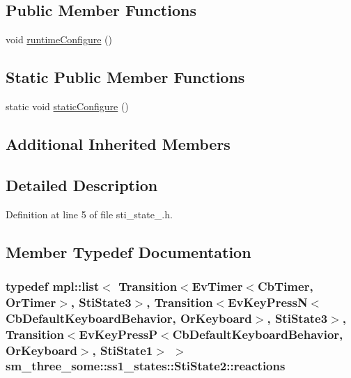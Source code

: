 \subsection*{Public Member Functions}
\begin{DoxyCompactItemize}
\item 
void \hyperlink{structsm__three__some_1_1ss1__states_1_1StiState2_ad106d6241b8c5106f0bce5292c7af09a}{runtime\+Configure} ()
\end{DoxyCompactItemize}
\subsection*{Static Public Member Functions}
\begin{DoxyCompactItemize}
\item 
static void \hyperlink{structsm__three__some_1_1ss1__states_1_1StiState2_ae3565c400d5fe4023e67b6825a168464}{static\+Configure} ()
\end{DoxyCompactItemize}
\subsection*{Additional Inherited Members}


\subsection{Detailed Description}


Definition at line 5 of file sti\+\_\+state\+\_.\+h.



\subsection{Member Typedef Documentation}
\subsubsection[{\texorpdfstring{reactions}{reactions}}]{\setlength{\rightskip}{0pt plus 5cm}typedef mpl\+::list$<$ Transition$<$Ev\+Timer$<$Cb\+Timer, {\bf Or\+Timer}$>$, {\bf Sti\+State3}$>$, Transition$<$Ev\+Key\+PressN$<$Cb\+Default\+Keyboard\+Behavior, {\bf Or\+Keyboard}$>$, {\bf Sti\+State3}$>$, Transition$<$Ev\+Key\+PressP$<$Cb\+Default\+Keyboard\+Behavior, {\bf Or\+Keyboard}$>$, {\bf Sti\+State1}$>$ $>$ {\bf sm\+\_\+three\+\_\+some\+::ss1\+\_\+states\+::\+Sti\+State2\+::reactions}}\hypertarget{structsm__three__some_1_1ss1__states_1_1StiState2_a3a6dd1b1f9cf7033bbb6e0c6bbc76f5c}{}\label{structsm__three__some_1_1ss1__states_1_1StiState2_a3a6dd1b1f9cf7033bbb6e0c6bbc76f5c}


